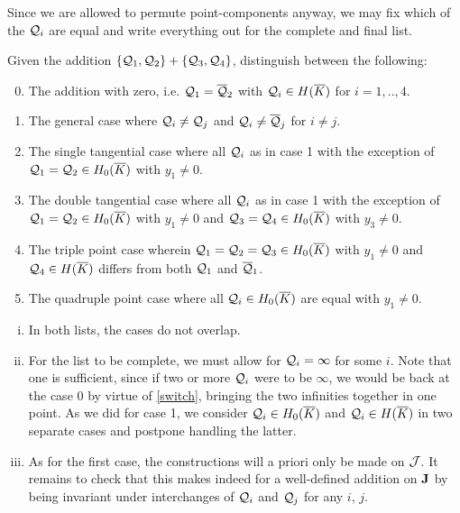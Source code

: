 \documentclass[english,11pt,a4paper]{article}
\begin{document}
\newpage

Since we are allowed to permute point-components anyway, we may fix which of the $\mathcal{Q}_i$ are equal and write everything out for the complete and final list.

\begin{center}
  Given the addition $\{ \mathcal{Q}_1 , \mathcal{Q}_2 \} + \{ \mathcal{Q}_3 , \mathcal{Q}_4 \}$, distinguish between the following:
\end{center}

\vspace{-3mm}
\fline
\begin{enumerate}\setcounter{enumi}{-1}
  \parskip 1mm
  \item The addition with zero, i.e. $\mathcal{Q}_1 = \overline {\mathcal{Q}}_2$ with $\mathcal{Q}_i \in H(\overline K)$ for $i = 1,..,4$.
  \item The general case where $\mathcal{Q}_i \neq \mathcal{Q}_j$ and $\mathcal{Q}_i \neq \overline {\mathcal{Q}}_j$ for $i \neq j$.
  \item The single tangential case where all $\mathcal{Q}_i$ as in case 1 with the exception of $\mathcal{Q}_1 = \mathcal{Q}_2 \in H_0(\overline K)$ with $y_1 \neq 0$.
  \item The double tangential case where all $\mathcal{Q}_i$ as in case 1 with the exception of $\mathcal{Q}_1 = \mathcal{Q}_2 \in H_0(\overline K)$ with $y_1 \neq 0$ and $\mathcal{Q}_3 = \mathcal{Q}_4 \in H_0(\overline K)$ with $y_3 \neq 0$.
  \item The triple point case wherein $\mathcal{Q}_1=\mathcal{Q}_2=\mathcal{Q}_3 \in H_0(\overline K)$ with $y_1 \neq 0$ and $\mathcal{Q}_4 \in H(\overline K)$ differs from both $\mathcal{Q}_1$ and $\overline {\mathcal{Q}}_1$.
  \item The quadruple point case where all $\mathcal{Q}_i \in H_0(\overline K)$ are equal with $y_1\neq 0$.
\end{enumerate}
\vspace{-2mm}
\fline
\parskip 3mm

\begin{remark}\label{rem}\hfill
\begin{enumerate}[(i)]
  \item In both lists, the cases do not overlap.
  
  \item For the list to be complete, we must allow for $\mathcal{Q}_i = \infty$ for some $i$. Note that one is sufficient, since if two or more $\mathcal{Q}_i$ were to be $\infty$, we would be back at the case 0 by virtue of \eqref{switch}, bringing the two infinities together in one point. As we did for case 1, we consider $\mathcal{Q}_i \in H_0(\overline K)$ and $\mathcal{Q}_i \in H(\overline K)$ in two separate cases and postpone handling the latter.\label{extend}

  \item As for the first case, the constructions will a priori only be made on $\mathcal{J}$. It remains to check that this makes indeed for a well-defined addition on $\mathbf{J}$ by being invariant under interchanges of $\mathcal{Q}_i$ and $\mathcal{Q}_j$ for any $i$, $j$.
\end{enumerate}
\end{remark}
\end{document}

